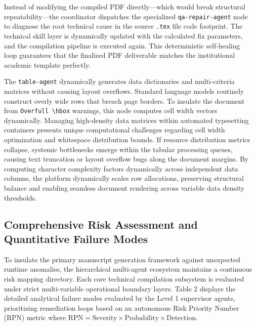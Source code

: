 Instead of modifying the compiled PDF directly—which would break structural repeatability—the coordinator dispatches the specialized \texttt{qa-repair-agent} node to diagnose the root technical cause in the source \texttt{.tex} file code footprint. The technical skill layer is dynamically updated with the calculated fix parameters, and the compilation pipeline is executed again. This deterministic self-healing loop guarantees that the finalized PDF deliverable matches the institutional academic template perfectly.

The \texttt{table-agent} dynamically generates data dictionaries and multi-criteria matrices without causing layout overflows. Standard language models routinely construct overly wide rows that breach page borders. To insulate the document from \texttt{Overfull \textbackslash hbox} warnings, this node computes cell width vectors dynamically. Managing high-density data matrices within automated typesetting containers presents unique computational challenges regarding cell width optimization and whitespace distribution bounds. If resource distribution metrics collapse, systemic bottlenecks emerge within the tabular processing queues, causing text truncation or layout overflow bugs along the document margins. By computing character complexity factors dynamically across independent data columns, the platform dynamically scales row allocations, preserving structural balance and enabling seamless document rendering across variable data density thresholds.

\subsection{Comprehensive Risk Assessment and Quantitative Failure Modes}
To insulate the primary manuscript generation framework against unexpected runtime anomalies, the hierarchical multi-agent ecosystem maintains a continuous risk mapping directory. Each core technical compilation subsystem is evaluated under strict multi-variable operational boundary layers. Table 2 displays the detailed analytical failure modes evaluated by the Level 1 supervisor agents, prioritizing remediation loops based on an autonomous Risk Priority Number (RPN) metric where $\text{RPN} = \text{Severity} \times \text{Probability} \times \text{Detection}$.

